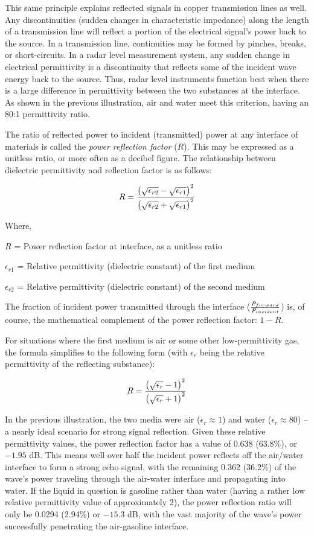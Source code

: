 This same principle explains reflected signals in copper transmission lines as well.  Any discontinuities (sudden changes in characteristic impedance) along the length of a transmission line will reflect a portion of the electrical signal's power back to the source.  In a transmission line, continuities may be formed by pinches, breaks, or short-circuits.  In a radar level measurement system, any sudden change in electrical permittivity is a discontinuity that reflects some of the incident wave energy back to the source.  Thus, radar level instruments function best when there is a large difference in permittivity between the two substances at the interface.  As shown in the previous illustration, air and water meet this criterion, having an 80:1 permittivity ratio.

\filbreak

The ratio of reflected power to incident (transmitted) power at any interface of materials is called the \textit{power reflection factor} ($R$).  This may be expressed as a unitless ratio, or more often as a decibel figure.  The relationship between dielectric permittivity and reflection factor is as follows:   

$$R = {\left({\sqrt{\epsilon_{r2}} - \sqrt{\epsilon_{r1}}}\right)^2 \over \left(\sqrt{\epsilon_{r2}} + \sqrt{\epsilon_{r1}}\right)^2}$$

\noindent
Where,

$R$ = Power reflection factor at interface, as a unitless ratio

$\epsilon_{r1}$ = Relative permittivity (dielectric constant) of the first medium

$\epsilon_{r2}$ = Relative permittivity (dielectric constant) of the second medium

\vskip 10pt

The fraction of incident power transmitted through the interface ($P_{forward} \over P_{incident}$) is, of course, the mathematical complement of the power reflection factor: $1 - R$.

For situations where the first medium is air or some other low-permittivity gas, the formula simplifies to the following form (with $\epsilon_r$ being the relative permittivity of the reflecting substance):

$$R = {\left({\sqrt{\epsilon_{r}} - 1}\right)^2 \over \left(\sqrt{\epsilon_{r}} + 1 \right)^2}$$

In the previous illustration, the two media were air ($\epsilon_r \approx 1$) and water ($\epsilon_r \approx 80$) -- a nearly ideal scenario for strong signal reflection.  Given these relative permittivity values, the power reflection factor has a value of 0.638 (63.8\%), or $-1.95$ dB.  This means well over half the incident power reflects off the air/water interface to form a strong echo signal, with the remaining 0.362 (36.2\%) of the wave's power traveling through the air-water interface and propagating into water.  If the liquid in question is gasoline rather than water (having a rather low relative permittivity value of approximately 2), the power reflection ratio will only be 0.0294 (2.94\%) or $-15.3$ dB, with the vast majority of the wave's power successfully penetrating the air-gasoline interface.

